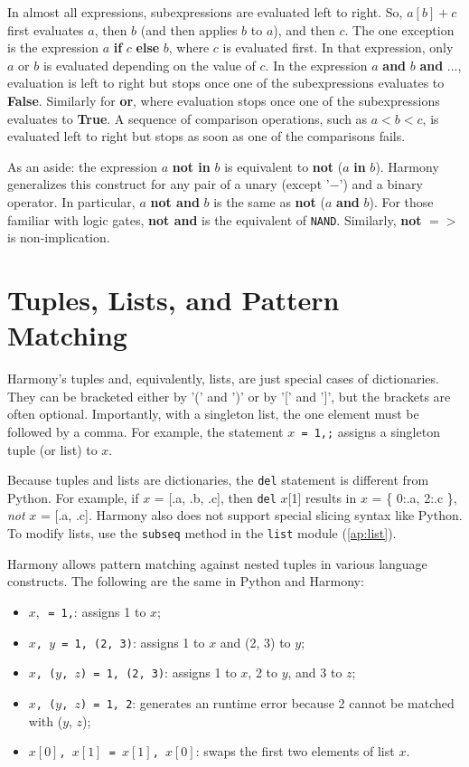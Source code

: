 \documentclass{report}
\begin{document}
In almost all expressions, subexpressions are evaluated left to right.
So, $a[b] + c$
first evaluates $a$, then $b$ (and then applies $b$ to $a$), and then $c$.  The one
exception is the expression $a$ \textbf{if} $c$ \textbf{else} $b$, where $c$ is evaluated
first.  In that expression, only $a$ or $b$ is evaluated depending on the value of $c$.
In the expression $a$ \textbf{and} $b$ \textbf{and} $...$, evaluation is left
to right but stops once one of the subexpressions evaluates to \textbf{False}.
Similarly for \textbf{or}, where evaluation stops once one of the subexpressions
evaluates to \textbf{True}.
A sequence of comparison operations, such as $a < b < c$, is evaluated left to right
but stops as soon as one of the comparisons fails.

As an aside:
the expression $a$ \textbf{not in} $b$ is equivalent to \textbf{not} ($a$ \textbf{in} $b$).
Harmony generalizes this construct for any pair of a unary (except '$-$') and a binary operator.
In particular, $a$ \textbf{not and} $b$ is the same as \textbf{not} ($a$ \textbf{and} $b$).  
For those familiar with logic gates, \textbf{not and} is the equivalent of \texttt{NAND}.
Similarly, \textbf{not} \texttt{$=>$} is non-implication.

\section{Tuples, Lists, and Pattern Matching}

Harmony's tuples and, equivalently, lists, are just special cases of dictionaries.
They can be bracketed either by '(' and ')' or by '[' and ']', but
the brackets are often optional.  Importantly, with a singleton list, the
one element must be followed by a comma.
For example, the statement \texttt{$x$ = 1,;} assigns a singleton tuple (or list) to $x$.

Because tuples and lists are dictionaries, the \texttt{del} statement is
different from Python.  For example, if $x$ = [.a, .b, .c], then
\texttt{del} $x$[1] results in $x$ = \{ 0:.a, 2:.c \}, \emph{not}
$x$ = [.a, .c].
Harmony also does not support special slicing syntax like Python.
To modify lists, use the \texttt{subseq} method in the \texttt{list} module
(\autoref{ap:list}).

Harmony allows pattern matching against nested tuples in various
language constructs.
%
The following are the same in Python and Harmony:
\begin{itemize}
\item \texttt{$x,$ = 1,}: assigns 1 to $x$;
\item \texttt{$x$, $y$ = 1, (2, 3)}: assigns 1 to $x$ and (2, 3) to $y$;
\item \texttt{$x$, ($y$, $z$) = 1, (2, 3)}: assigns 1 to $x$, 2 to $y$, and
3 to $z$;
\item \texttt{$x$, ($y$, $z$) = 1, 2}: generates an runtime error because 2 cannot
be matched with ($y$, $z$);
\item \texttt{$x[0]$, $x[1]$ = $x[1]$, $x[0]$}: swaps the first two elements of list $x$.
\end{itemize}
\end{document}
